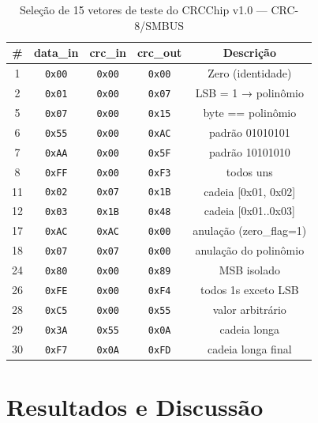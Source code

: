 \documentclass[12pt,a4paper]{article}
\begin{document}
\begin{table}[h!]
\centering
\caption{Seleção de 15 vetores de teste do CRCChip v1.0 --- CRC-8/SMBUS}
\label{tab:vetores}
\begin{tabular}{ccccc}
\toprule
\textbf{\#} & \textbf{data\_in} & \textbf{crc\_in} & \textbf{crc\_out} & \textbf{Descrição} \\
\midrule
 1 & \texttt{0x00} & \texttt{0x00} & \texttt{0x00} & Zero (identidade) \\
 2 & \texttt{0x01} & \texttt{0x00} & \texttt{0x07} & LSB = 1 → polinômio \\
 5 & \texttt{0x07} & \texttt{0x00} & \texttt{0x15} & byte == polinômio \\
 6 & \texttt{0x55} & \texttt{0x00} & \texttt{0xAC} & padrão 01010101 \\
 7 & \texttt{0xAA} & \texttt{0x00} & \texttt{0x5F} & padrão 10101010 \\
 8 & \texttt{0xFF} & \texttt{0x00} & \texttt{0xF3} & todos uns \\
11 & \texttt{0x02} & \texttt{0x07} & \texttt{0x1B} & cadeia [0x01, 0x02] \\
12 & \texttt{0x03} & \texttt{0x1B} & \texttt{0x48} & cadeia [0x01..0x03] \\
17 & \texttt{0xAC} & \texttt{0xAC} & \texttt{0x00} & anulação (zero\_flag=1) \\
18 & \texttt{0x07} & \texttt{0x07} & \texttt{0x00} & anulação do polinômio \\
24 & \texttt{0x80} & \texttt{0x00} & \texttt{0x89} & MSB isolado \\
26 & \texttt{0xFE} & \texttt{0x00} & \texttt{0xF4} & todos 1s exceto LSB \\
28 & \texttt{0xC5} & \texttt{0x00} & \texttt{0x55} & valor arbitrário \\
29 & \texttt{0x3A} & \texttt{0x55} & \texttt{0x0A} & cadeia longa \\
30 & \texttt{0xF7} & \texttt{0x0A} & \texttt{0xFD} & cadeia longa final \\
\bottomrule
\end{tabular}
\end{table}

\section{Resultados e Discussão}
\end{document}
